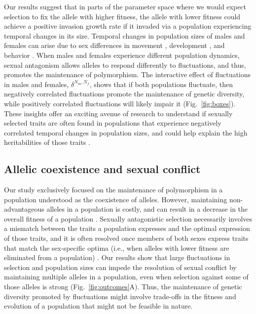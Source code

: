 \documentclass[12pt]{article}
\begin{document}
 Our results suggest that in parts of the parameter space where we would expect selection to fix the allele with higher fitness, the allele with lower fitness could achieve a positive invasion growth rate if it invaded via a population experiencing temporal changes in its size.  Temporal changes in population sizes of males and females can arise due to sex differences in movement \citep[e.g., if males immigrate to higher quality areas,][]{matter2002experimental}, development \citep[e.g.,females requiring more time to mature than males,][]{kasumovic2008spatial}, and behavior \citep[e.g., cannibalistic mating][]{elgar2003male}. When males and females experience different population dynamics, sexual antagonism allows alleles to respond differently to fluctuations, and thus, promotes the maintenance of polymorphism. The interactive effect of fluctuations in males and females, $\delta^{N_{m},N_{f}}$, shows that if both populations fluctuate, then negatively correlated fluctuations promote the maintenance of genetic diversity, while positively correlated fluctuations will likely impair it  (Fig.~\ref{fig:boxes}). These insights offer an exciting avenue of research to understand if sexually selected traits are often found in populations that experience negatively correlated temporal changes in population sizes, and could help explain the high heritabilities of those traits \citep{reinhold2000maintenance}.

 \subsection*{Allelic coexistence and sexual conflict}

 Our study exclusively focused on the maintenance of polymorphism in a population understood as the coexistence of alleles. However, maintaining non-advantageous alleles in a population is costly, and can result in a decrease in the overall fitness of a population \citep{connallon2018environmental}. Sexually antagonistic selection necessarily involves a mismatch between the traits a population expresses and the optimal expression of those traits, and it is often resolved once members of both sexes express traits that match the sex-specific optima (i.e., when alleles with lower fitness are eliminated from a population) \citep{lande1980sexual}. Our results show that large fluctuations in selection and population sizes can impede the resolution of sexual conflict by maintaining multiple alleles in a population, even when selection against some of those alleles is strong (Fig.~\ref{fig:outcomes}A). Thus, the maintenance of genetic diversity promoted by fluctuations might involve trade-offs in the fitness and evolution of a population that might not be feasible in nature.
\end{document}
